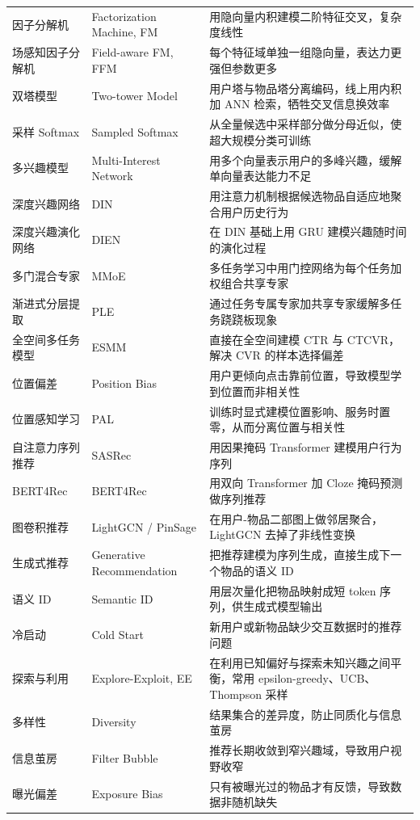 \begin{xltabular}{\textwidth}{L{3.0cm} L{3.6cm} Y}
因子分解机 & Factorization Machine, FM & 用隐向量内积建模二阶特征交叉，复杂度线性 \\
场感知因子分解机 & Field-aware FM, FFM & 每个特征域单独一组隐向量，表达力更强但参数更多 \\
双塔模型 & Two-tower Model & 用户塔与物品塔分离编码，线上用内积加 ANN 检索，牺牲交叉信息换效率 \\
采样 Softmax & Sampled Softmax & 从全量候选中采样部分做分母近似，使超大规模分类可训练 \\
多兴趣模型 & Multi-Interest Network & 用多个向量表示用户的多峰兴趣，缓解单向量表达能力不足 \\
深度兴趣网络 & DIN & 用注意力机制根据候选物品自适应地聚合用户历史行为 \\
深度兴趣演化网络 & DIEN & 在 DIN 基础上用 GRU 建模兴趣随时间的演化过程 \\
多门混合专家 & MMoE & 多任务学习中用门控网络为每个任务加权组合共享专家 \\
渐进式分层提取 & PLE & 通过任务专属专家加共享专家缓解多任务跷跷板现象 \\
全空间多任务模型 & ESMM & 直接在全空间建模 CTR 与 CTCVR，解决 CVR 的样本选择偏差 \\
位置偏差 & Position Bias & 用户更倾向点击靠前位置，导致模型学到位置而非相关性 \\
位置感知学习 & PAL & 训练时显式建模位置影响、服务时置零，从而分离位置与相关性 \\
自注意力序列推荐 & SASRec & 用因果掩码 Transformer 建模用户行为序列 \\
BERT4Rec & BERT4Rec & 用双向 Transformer 加 Cloze 掩码预测做序列推荐 \\
图卷积推荐 & LightGCN / PinSage & 在用户-物品二部图上做邻居聚合，LightGCN 去掉了非线性变换 \\
生成式推荐 & Generative Recommendation & 把推荐建模为序列生成，直接生成下一个物品的语义 ID \\
语义 ID & Semantic ID & 用层次量化把物品映射成短 token 序列，供生成式模型输出 \\
冷启动 & Cold Start & 新用户或新物品缺少交互数据时的推荐问题 \\
探索与利用 & Explore-Exploit, EE & 在利用已知偏好与探索未知兴趣之间平衡，常用 epsilon-greedy、UCB、Thompson 采样 \\
多样性 & Diversity & 结果集合的差异度，防止同质化与信息茧房 \\
信息茧房 & Filter Bubble & 推荐长期收敛到窄兴趣域，导致用户视野收窄 \\
曝光偏差 & Exposure Bias & 只有被曝光过的物品才有反馈，导致数据非随机缺失 \\

\end{xltabular}
